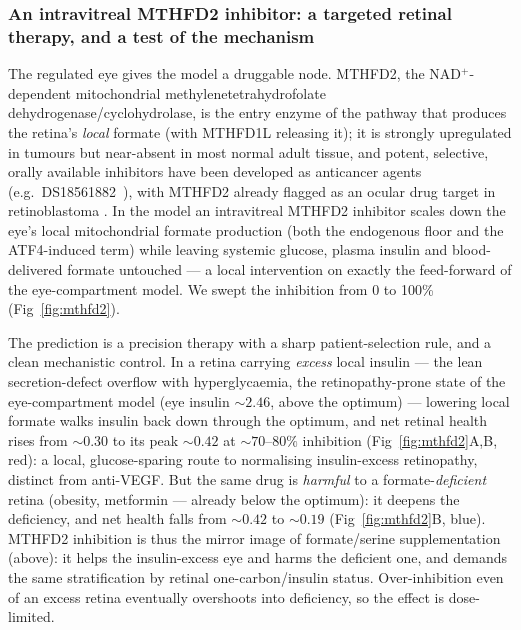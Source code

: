 \documentclass[10pt,letterpaper]{article}
\begin{document}
\subsubsection*{An intravitreal MTHFD2 inhibitor: a targeted retinal therapy, and a
test of the mechanism}
The regulated eye gives the model a druggable node. MTHFD2, the NAD$^+$-dependent
mitochondrial methylenetetrahydrofolate dehydrogenase/cyclohydrolase, is the entry
enzyme of the pathway that produces the retina's \emph{local} formate (with
MTHFD1L releasing it); it is strongly upregulated in tumours but near-absent in
most normal adult tissue, and potent, selective, orally available inhibitors have
been developed as anticancer agents (e.g.\ DS18561882~\cite{kawai2019}),
with MTHFD2 already flagged as an ocular drug target in retinoblastoma
\cite{yao2025}. In the model an intravitreal MTHFD2 inhibitor scales down
the eye's local mitochondrial formate production (both the endogenous floor and the
ATF4-induced term) while leaving systemic glucose, plasma insulin and
blood-delivered formate untouched --- a local intervention on exactly the
feed-forward of the eye-compartment model. We swept the inhibition from 0 to 100\%
(Fig~\ref{fig:mthfd2}).

The prediction is a precision therapy with a sharp patient-selection rule, and a
clean mechanistic control. In a retina carrying \emph{excess} local insulin --- the
lean secretion-defect overflow with hyperglycaemia, the retinopathy-prone state of
the eye-compartment model (eye insulin ${\sim}2.46$, above the optimum) --- lowering local formate
walks insulin back down through the optimum, and net retinal health rises from
${\sim}0.30$ to its peak ${\sim}0.42$ at ${\sim}70$--$80\%$ inhibition
(Fig~\ref{fig:mthfd2}A,B, red): a local, glucose-sparing route to normalising
insulin-excess retinopathy, distinct from anti-VEGF. But the same drug is
\emph{harmful} to a formate-\emph{deficient} retina (obesity, metformin --- already
below the optimum): it deepens the deficiency, and net health falls from
${\sim}0.42$ to ${\sim}0.19$ (Fig~\ref{fig:mthfd2}B, blue). MTHFD2 inhibition is
thus the mirror image of formate/serine supplementation (above): it helps the
insulin-excess eye and harms the deficient one, and demands the same stratification
by retinal one-carbon/insulin status. Over-inhibition even of an excess retina
eventually overshoots into deficiency, so the effect is dose-limited.
\end{document}
